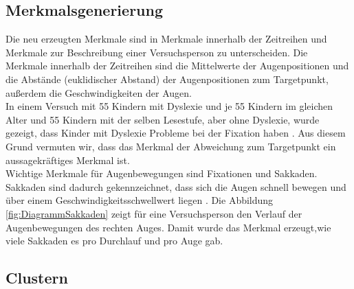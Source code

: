 \documentclass[12pt]{article}
\begin{document}
\subsection*{Merkmalsgenerierung}
Die neu erzeugten Merkmale sind in Merkmale innerhalb der Zeitreihen und Merkmale zur Beschreibung einer Versuchsperson zu unterscheiden. Die Merkmale innerhalb der Zeitreihen sind die Mittelwerte der Augenpositionen und die Abst\"ande (euklidischer Abstand) der Augenpositionen zum Targetpunkt, au\ss{}erdem die Geschwindigkeiten der Augen.\\
In einem Versuch mit 55 Kindern mit Dyslexie und je 55 Kindern im gleichen Alter und 55 Kindern mit der selben Lesestufe, aber ohne Dyslexie, wurde gezeigt, dass Kinder mit Dyslexie Probleme bei der Fixation haben \cite{Tiadi2016}. Aus diesem Grund vermuten wir, dass das Merkmal der Abweichung zum Targetpunkt ein aussagekr\"aftiges Merkmal ist.\\
Wichtige Merkmale f\"ur Augenbewegungen sind Fixationen und Sakkaden. Sakkaden sind dadurch gekennzeichnet, dass sich die Augen schnell bewegen und \"uber einem Geschwindigkeits\-schwellwert liegen \cite[p.~152]{EyeTracking}. Die Abbildung \ref{fig:DiagrammSakkaden} zeigt f\"ur eine Versuchsperson den Verlauf der Augenbewegungen des rechten Auges. Damit wurde das Merkmal erzeugt,wie viele Sakkaden es pro Durchlauf und pro Auge gab.

\subsection*{Clustern}
\end{document}
